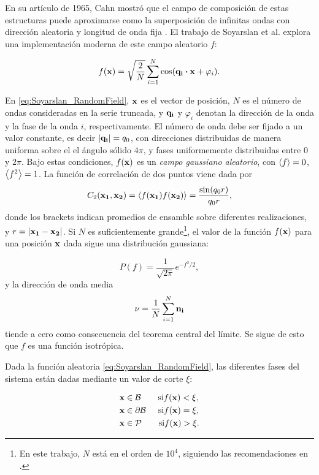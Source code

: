 \documentclass{article}
\begin{document}
En su artículo de 1965, Cahn mostró que el campo de composición de estas estructuras puede aproximarse como la superposición de infinitas ondas con dirección aleatoria y longitud de onda fija \cite{Cahn1965}. El trabajo de Soyarslan et al. explora una implementación moderna de este campo aleatorio $f$: 

\begin{equation}
    f(\vb{x}) = \sqrt{\frac{2}{N}}\sum_{i=1}^N \cos(\vb{q_i}\vdot\vb{x}+\varphi_i).
    \label{eq:Soyarslan_RandomField}
\end{equation}

En \eqref{eq:Soyarslan_RandomField}, $\vb{x}$ es el vector de posición, $N$ es el número de ondas consideradas en la serie truncada, y $\vb{q_i}$ y $\varphi_i$ denotan la dirección de la onda y la fase de la onda $i$, respectivamente. El número de onda debe ser fijado a un valor constante, es decir $\abs{\vb{q_i}} = q_0$, con direcciones distribuidas de manera uniforma sobre el el ángulo sólido $4\pi$, y fases uniformemente distribuidas entre $0$ y $2\pi$. Bajo estas condiciones, $f(\vb{x})$ es un \textit{campo gaussiano aleatorio}, con $\expval{f}=0$, $\expval{f^2}=1$. La función de correlación de dos puntos viene dada por 
\begin{equation}
    C_2(\vb{x_1,x_2}) = \expval{f(\vb{x_1})f(\vb{x_2})} = \frac{\sin(q_0r)}{q_0r},
    \label{eq:Soyarslan_Corrx1x2}
\end{equation}
donde los brackets indican promedios de ensamble sobre diferentes realizaciones, y $r=\abs{\vb{x_1-x_2}}$. Si $N$ es suficientemente grande\footnote{En este trabajo, $N$ está en el orden de $10^4$, siguiendo las recomendaciones en \cite{Soyarslan2018}.}, el valor de la función $f(\vb{x)}$ para una posición $\vb{x}$ dada sigue una distribución gaussiana: 

\begin{equation}
    P(f) = \frac{1}{\sqrt{2\pi}}e^{-f^2/2},
    \label{eq:Soyarslan_fGauss}
\end{equation}
y la dirección de onda media 
\begin{equation}
    \vb{\nu} = \frac{1}{N} \sum_{i=1}^N \vb{n_i}
\end{equation}
tiende a cero como consecuencia del teorema central del límite. Se sigue de esto que $f$ es una función isotrópica. 

Dada la función aleatoria \eqref{eq:Soyarslan_RandomField}, las diferentes fases del sistema están dadas mediante un valor de corte $\xi$: 

\begin{equation}
\begin{split}
    &\vb{x}\in\mathcal{B}\qquad\text{si}f(\vb{x})<\xi,\\
    &\vb{x}\in\partial\mathcal{B}\;\,\quad\text{si}f(\vb{x})=\xi,\\
    &\vb{x}\in\mathcal{P}\qquad\text{si}f(\vb{x})>\xi.
\end{split}
\label{eq:Soyarslan_CutValuexi}
\end{equation}
\end{document}
